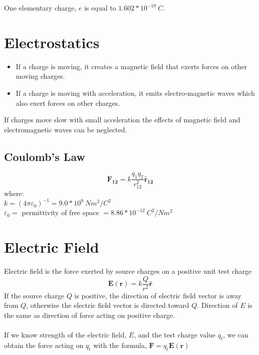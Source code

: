 \documentclass{article}
\begin{document}
One elementary charge, $e$ is equal to $1.602*10^{-19} \: C$.

\section*{Electrostatics}
\begin{itemize}
    \item If a charge is moving, it creates a magnetic field that exerts forces on other moving
    charges.
    \item If a charge is moving with acceleration, it emits electro-magnetic waves which also exert
    forces on other charges.
\end{itemize}
If charges move slow with small acceleration the effects of magnetic field and electromagnetic
waves can be neglected.
\subsection*{Coulomb's Law}
\[\pmb{F_{12}}=k\frac{q_1 q_2}{r_{12}^2}\pmb{\hat{r}_{12}}\]
where: \\
$k={(4\pi\varepsilon_0)}^{-1}=9.0*10^9 \: N m^2 / C^2$ \\
$\varepsilon_0=$ permittivity of free space $= 8.86 * 10^{-12} \: C^2 / N m^2$

\section*{Electric Field}
Electric field is the force exerted by source charges on a positive unit test charge
\[\pmb{E(r)}=k\frac{Q}{r^2}\pmb{\hat{r}}\]
If the source charge $Q$ is positive, the direction of electric field vector is away from $Q$,
otherwise the electric field vector is directed toward $Q$. Direction of $E$ is the same as
direction of force acting on positive charge. \\ \\
If we know strength of the electric field, $E$, and the test charge value $q_t$, we can obtain the
force acting on $q_t$ with the formula, $\pmb{F} = q_t \pmb{E(r)}$
\end{document}
